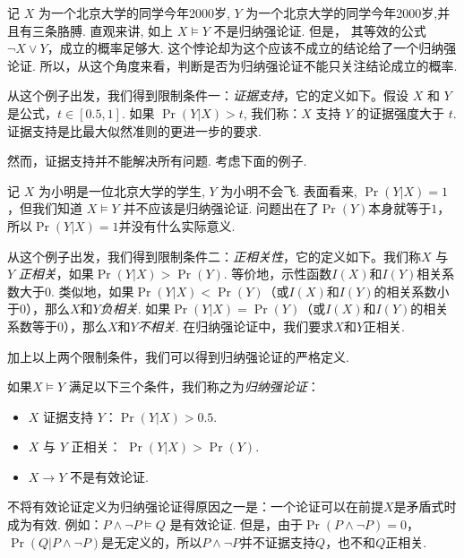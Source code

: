 \begin{example}[奇怪的例子一]
记 $X$ 为一个北京大学的同学今年2000岁, $Y$ 为一个北京大学的同学今年2000岁,并且有三条胳膊. 直观来讲, 如上 $X\models Y$ 不是归纳强论证. 但是， 其等效的公式$\neg X\vee Y$，成立的概率足够大. 这个悖论却为这个应该不成立的结论给了一个归纳强论证. 所以，从这个角度来看，判断是否为归纳强论证不能只关注结论成立的概率.
\end{example}

从这个例子出发，我们得到限制条件一：\emph{证据支持}，它的定义如下。假设 $X$ 和 $Y$ 是公式，$t\in [0.5, 1]$. 如果 $\Pr(Y|X)>t$, 我们称：$X$ 支持 $Y$ 的证据强度大于 $t$. 证据支持是比最大似然准则的更进一步的要求.

然而，证据支持并不能解决所有问题. 考虑下面的例子.

\begin{example}[奇怪的例子二]
记 $X$ 为小明是一位北京大学的学生, $Y$ 为小明不会飞. 表面看来, $\Pr(Y|X)=1$，但我们知道 $X\models Y$ 并不应该是归纳强论证. 问题出在了$\Pr(Y)$本身就等于$1$，所以$\Pr(Y|X)=1$并没有什么实际意义.
\end{example}

从这个例子出发，我们得到限制条件二：\emph{正相关性}，它的定义如下。我们称$X$ 与 $Y$ \emph{正相关}，如果$\Pr(Y|X) > \Pr(Y)$. 等价地，示性函数$I(X)$和$I(Y)$相关系数大于$0$. 类似地，如果$\Pr(Y|X) < \Pr(Y)$（或$I(X)$和$I(Y)$的相关系数小于$0$），那么$X$和$Y$\emph{负相关}. 如果$\Pr(Y|X) = \Pr(Y)$（或$I(X)$和$I(Y)$的相关系数等于$0$），那么$X$和$Y$\emph{不相关}. 在归纳强论证中，我们要求$X$和$Y$正相关.

加上以上两个限制条件，我们可以得到归纳强论证的严格定义.

\begin{definition}[归纳强论证]
    如果$X \models Y$ 满足以下三个条件，我们称之为\emph{归纳强论证}：
	\begin{itemize}
	\item $X$ 证据支持 $Y$：$\Pr(Y|X)>0.5$.
	\item $X$ 与 $Y$ 正相关： $\Pr(Y|X) > \Pr(Y)$. 
	\item $X\rightarrow Y$ 不是有效论证.
	\end{itemize}
\end{definition}

不将有效论证定义为归纳强论证得原因之一是：一个论证可以在前提$X$是矛盾式时成为有效. 例如：$P \wedge \neg P \models Q$ 是有效论证. 但是，由于$\Pr(P \wedge \neg P) = 0$，$\Pr(Q | P \wedge \neg P)$是无定义的，所以$P \wedge \neg P$并不证据支持$Q$，也不和$Q$正相关.

